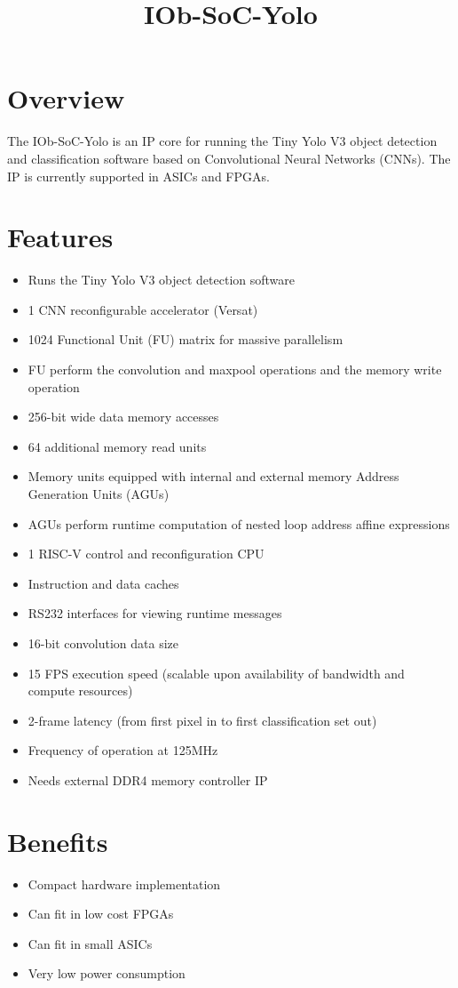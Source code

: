 \documentclass[twocolumn]{iob_pb}
\title{IOb-SoC-Yolo}
\newcommand\BackgroundPic{%
\put(0,0){%
\parbox[b][\paperheight]{\paperwidth}{%
\vfill
\centering
\texttt{[image: bg.png]}%
\vfill
}}}
\begin{document}
\AddToShipoutPicture*{\BackgroundPic}

\section*{\textcolor[rgb]{0,0,0}{Overview}}

The IOb-SoC-Yolo is an IP core for running the Tiny Yolo V3 object detection and
classification software based on Convolutional Neural Networks (CNNs). The IP is
currently supported in ASICs and FPGAs.

\section*{\textcolor[rgb]{0,0,0}{Features}}
\begin{itemize}
\item Runs the Tiny Yolo V3 object detection software
\item 1 CNN reconfigurable accelerator (Versat)
\item 1024 Functional Unit (FU) matrix for massive parallelism
\item FU perform the convolution and maxpool operations and the memory write operation
\item 256-bit wide data memory accesses
\item 64 additional memory read units
\item Memory units equipped with internal and external memory Address Generation Units (AGUs)
\item AGUs perform runtime computation of nested loop address affine expressions 
\item 1 RISC-V control and reconfiguration CPU
\item Instruction and data caches
\item RS232 interfaces for viewing runtime messages
\item 16-bit convolution data size
\item 15 FPS execution speed (scalable upon availability of bandwidth and compute resources)
\item 2-frame latency (from first pixel in to first classification set out)
\item Frequency of operation at 125MHz
\item Needs external DDR4 memory controller IP
\end{itemize}

\section*{\textcolor[rgb]{0,0,0}{Benefits}}
\begin{itemize}
\item Compact hardware implementation
\item Can fit in low cost FPGAs
\item Can fit in small ASICs 
\item Very low power consumption
\end{itemize}
\end{document}
